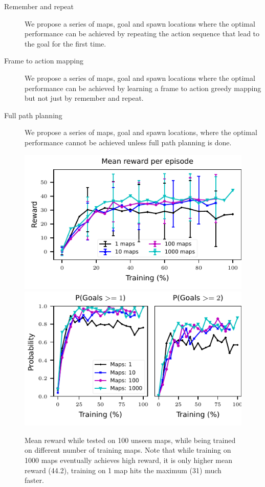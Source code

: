 \begin{description}
    \begin{description}
      \item[Remember and repeat]
        We propose a series of maps, goal and spawn locations where the optimal performance can be achieved by repeating the action sequence that lead to the goal for the first time.
      \item[Frame to action mapping]
        We propose a series of maps, goal and spawn locations where the optimal performance can be achieved by learning a frame to action greedy mapping but not just by remember and repeat.
      \item[Full path planning]
        We propose a series of maps, goal and spawn locations, where the optimal performance cannot be achieved unless full path planning is done.
    \end{description}
\end{description}

\begin{figure}
 \vspace{-3em}%
\includegraphics[width=0.5\columnwidth]{images/plot_reward_3D-1000.pdf}%
\includegraphics[width=0.5\columnwidth]{images/plot_probability_3D-1000.pdf}%
\vspace{-1em}%
\caption{Mean reward while tested on 100 unseen maps, while being trained on different number of training maps. Note that while training on 1000 maps eventually achieves high reward, it is only higher mean reward (44.2), training on 1 map hits the maximum (31) much faster.}
\label{fig:plot_reward_on_testing}
\end{figure}

